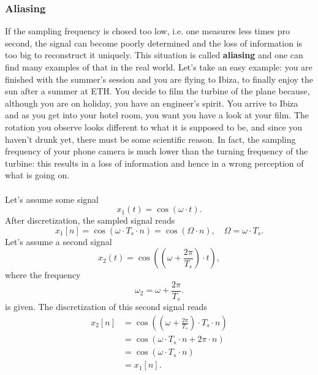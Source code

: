 \documentclass[a4paper,12 pt]{article}
\numberwithin{equation}{section}
\theoremstyle{definition}
\theoremstyle{remark}
\theoremstyle{definition}
\theoremstyle{definition}
\theoremstyle{definition}
\theoremstyle{remark}
\begin{document}
\subsubsection*{Aliasing}
If the sampling frequency is chosed too low, i.e. one measures less times pro second, the signal can become poorly determined and the loss of information is too big to reconstruct it uniquely. This situation is called \textbf{aliasing} and one can find many examples of that in the real world. Let's take an easy example: you are finished with the summer's session and you are flying to Ibiza, to finally enjoy the sun after a summer at ETH. You decide to film the turbine of the plane because, although you are on holiday, you have an engineer's spirit. You arrive to Ibiza and as you get into your hotel room, you want you have a look at your film. The rotation you observe looks different to what it is supposed to be, and since you haven't drunk yet, there must be some scientific reason. In fact, the sampling frequency of your phone camera is much lower than the turning frequency of the turbine: this results in a loss of information and hence in a wrong perception of what is going on.\\ \\ 
Let's assume some signal 
\begin{equation}
x_1(t)=\cos(\omega \cdot t).
\end{equation}
After discretization, the sampled signal reads
\begin{equation}
x_1[n]=\cos(\omega \cdot T_s \cdot n)=\cos(\Omega \cdot n), \quad \Omega=\omega \cdot T_s.
\end{equation}
Let's assume a second signal
\begin{equation}
x_2(t)=\cos \left(\left(\omega +\frac{2\pi}{T_s}\right)\cdot t\right),
\end{equation}
where the frequency
\begin{equation}
\omega_2=\omega+\frac{2\pi}{T_s}.
\end{equation}
is given. The discretization of this second signal reads
\begin{equation}
\begin{split}
x_2[n]&=\cos \left( \left( \omega + \frac{2\pi}{T_s}\right) \cdot T_s \cdot n\right)\\
&=\cos \left( \omega \cdot T_s \cdot n+ 2\pi \cdot n \right)\\
&=\cos(\omega \cdot T_s \cdot n)\\
&=x_1[n].
\end{split}
\end{equation}
\end{document}
